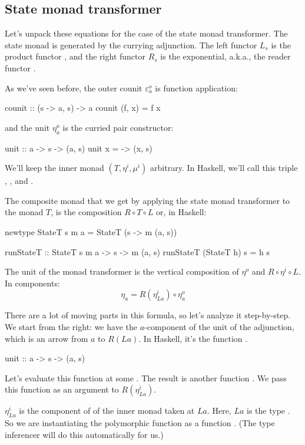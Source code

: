 \documentclass[DaoFP]{subfiles}
\begin{document}
\subsection{State monad transformer}

Let's unpack these equations for the case of the state monad transformer. The state monad is generated by the currying adjunction. The left functor $L_s$ is the product functor , and the right functor $R_s$ is the exponential, a.k.a., the reader functor . 

As we've seen before, the outer counit $\varepsilon^o_a$ is function application:
\begin{haskell}
counit :: (s -> a, s) -> a
counit (f, x) = f x
\end{haskell}
and the unit $\eta^o_a$ is the curried pair constructor:
\begin{haskell}
unit :: a -> s -> (a, s)
unit x = \s -> (x, s)
\end{haskell}


We'll keep the inner monad $(T, \eta^i, \mu^i)$ arbitrary. In Haskell, we'll call this triple , , and .

The composite monad that we get by applying the state monad transformer to the monad $T$, is the composition $R \circ T \circ L$ or, in Haskell:
\begin{haskell}
newtype StateT s m a = StateT (s -> m (a, s))
\end{haskell}

\begin{haskell}
runStateT :: StateT s m a -> s -> m (a, s)
runStateT (StateT h) s = h s
\end{haskell}

The unit of the monad transformer is the vertical composition of $\eta^o$ and $R \circ \eta^i \circ L$. In components:
\[ \eta_a = R(\eta^i_{L a}) \circ \eta^o_a \]

There are a lot of moving parts in this formula, so let's analyze it step-by-step. We start from the right: we have the $a$-component of the unit of the adjunction, which is an arrow from $a$ to $R (L a)$. In Haskell, it's the function . 
\begin{haskell}
unit :: a -> s -> (a, s)
\end{haskell}
Let's evaluate this function at some . The result is another function . We pass this function as an argument to $R(\eta^i_{L a})$. 

$\eta^i_{L a}$ is the component of  of the inner monad taken at $L a$. Here, $L a$ is the type . So we are instantiating the polymorphic function  as a function . (The type inferencer will do this automatically for us.)
\end{document}

